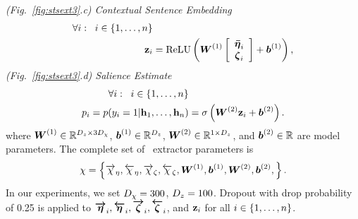 \vspace{10pt}   \noindent \textit{(Fig.~\ref{fig:stsext3}.c) Contextual Sentence Embedding} 
\begin{align}
    \forall i : \;\; i \in \{1,\ldots,n\} & \nonumber\\
    \mathbf{z}_i &= \operatorname{ReLU}\left(\boldsymbol{W}^{(1)} \left[\begin{array}{c}
        \boldsymbol{\bar{\eta}}_i \\ 
        \boldsymbol{\zeta}_i \end{array}\right] 
        + \boldsymbol{b}^{(1)} \right),
\end{align}
\vspace{10pt} \noindent \textit{(Fig.~\ref{fig:stsext3}.d) Salience Estimate}
\begin{align}
    \forall i : \;\; i \in \{1,\ldots,n\} & \nonumber\\
p_i =    p(y_i=1|\mathbf{h}_1, \ldots,\mathbf{h}_n)& = 
            \sigma\left(\boldsymbol{W}^{(2)} \mathbf{z}_i + \boldsymbol{b}^{(2)}  
            \right).
\end{align}
where $\boldsymbol{W}^{(1)} \in \mathbb{R}^{{D_z} \times 3{D_\chi}}$,
$\boldsymbol{b}^{(1)} \in \mathbb{R}^{{D_z}}$, 
$\boldsymbol{W}^{(2)} \in \mathbb{R}^{1 \times {D_z}}$, and
$\boldsymbol{b}^{(2)} \in \mathbb{R}$ are model parameters.
The complete set of \stsext~extractor parameters is 
\[\chi = \left\{ {\overrightarrow{\chi}_\eta}, {\overleftarrow{\chi}_\eta},
        {\overrightarrow{\chi}_\zeta}, {\overleftarrow{\chi}_\zeta}, \boldsymbol{W}^{(1)}, \boldsymbol{b}^{(1)}, \boldsymbol{W}^{(2)}, \boldsymbol{b}^{(2)}, \right\}. \]
        In our experiments, we set ${D_\chi}=300$, ${D_z}=100$.
        Dropout with drop probability of 0.25 is applied to $\boldsymbol{\overrightarrow{\eta}}_i,
        \boldsymbol{\overleftarrow{\eta}}_i, \boldsymbol{\overrightarrow{\zeta}}_i, \boldsymbol{\overleftarrow{\zeta}}_i$, and $\mathbf{z}_i$ for all $i \in \{1,\ldots,n\}$.

